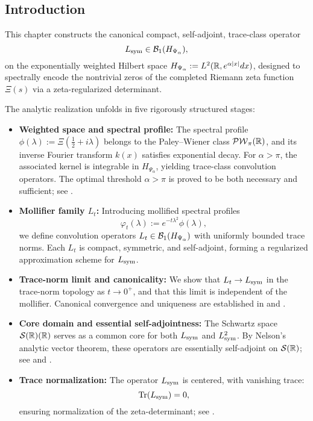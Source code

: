 \subsection*{Introduction}

This chapter constructs the canonical compact, self-adjoint, trace-class operator
\[
L_{\mathrm{sym}} \in \mathcal{B}_1(H_{\Psi_\alpha}),
\]
on the exponentially weighted Hilbert space \( H_{\Psi_\alpha} := L^2(\mathbb{R}, e^{\alpha |x|} dx) \), designed to spectrally encode the nontrivial zeros of the completed Riemann zeta function \( \Xi(s) \) via a zeta-regularized determinant.

The analytic realization unfolds in five rigorously structured stages:

\begin{itemize}
    \item \textbf{Weighted space and spectral profile:} The spectral profile \( \phi(\lambda) := \Xi(\tfrac{1}{2} + i\lambda) \) belongs to the Paley--Wiener class \( \mathcal{PW}_{\pi}(\mathbb{R}) \), and its inverse Fourier transform \( k(x) \) satisfies exponential decay. For \( \alpha > \pi \), the associated kernel is integrable in \( H_{\Psi_\alpha} \), yielding trace-class convolution operators. The optimal threshold \( \alpha > \pi \) is proved to be both necessary and sufficient; see .
    
    \item \textbf{Mollifier family \( L_t \):} Introducing mollified spectral profiles
    \[
    \varphi_t(\lambda) := e^{-t\lambda^2} \phi(\lambda),
    \]
    we define convolution operators \( L_t \in \mathcal{B}_1(H_{\Psi_\alpha}) \) with uniformly bounded trace norms. Each \( L_t \) is compact, symmetric, and self-adjoint, forming a regularized approximation scheme for \( L_{\mathrm{sym}} \).

    \item \textbf{Trace-norm limit and canonicality:} We show that \( L_t \to L_{\mathrm{sym}} \) in the trace-norm topology as \( t \to 0^+ \), and that this limit is independent of the mollifier. Canonical convergence and uniqueness are established in  and .

    \item \textbf{Core domain and essential self-adjointness:} The Schwartz space \( \mathcal{S}(\mathbb{R})(\mathbb{R}) \) serves as a common core for both \( L_{\mathrm{sym}} \) and \( L_{\mathrm{sym}}^2 \). By Nelson’s analytic vector theorem, these operators are essentially self-adjoint on \( \mathcal{S}(\mathbb{R}) \); see  and .

    \item \textbf{Trace normalization:} The operator \( L_{\mathrm{sym}} \) is centered, with vanishing trace:
    \[
    \operatorname{Tr}(L_{\mathrm{sym}}) = 0,
    \]
    ensuring normalization of the zeta-determinant; see .
\end{itemize}

